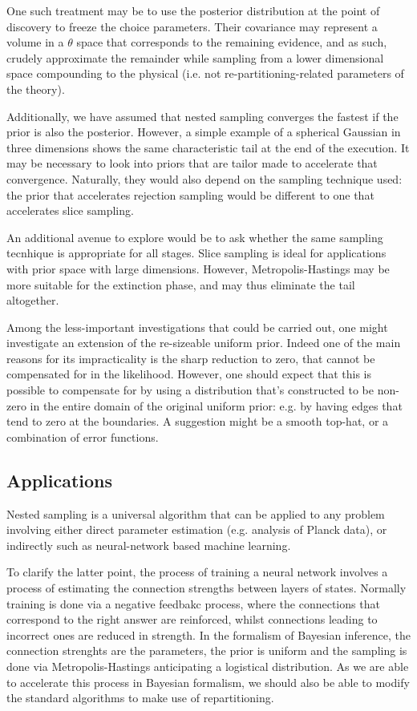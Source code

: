 \documentclass[usenatbib]{mnras}
\begin{document}
One such treatment may be to use the posterior distribution at the
point of discovery to freeze the choice parameters. Their
covariance may represent a volume in a \(\theta\) space that
corresponds to the remaining evidence, and as such, crudely
approximate the remainder while sampling from a lower dimensional
space compounding to the physical (i.e. not re-partitioning-related
parameters of the theory).

Additionally, we have assumed that nested sampling converges the
fastest if the prior is also the posterior. However, a simple
example of a spherical Gaussian in three dimensions shows the same
characteristic tail at the end of the execution. It may be
necessary to look into priors that are tailor made to accelerate
that convergence. Naturally, they would also depend on the sampling
technique used: the prior that accelerates rejection sampling would
be different to one that accelerates slice sampling.

An additional avenue to explore would be to ask whether the same
sampling tecnhique is appropriate for all stages. Slice sampling is
ideal for applications with prior space with large
dimensions. However, Metropolis-Hastings may be more suitable for
the extinction phase, and may thus eliminate the tail altogether.

Among the less-important investigations that could be carried out,
one might investigate an extension of the re-sizeable uniform
prior. Indeed one of the main reasons for its impracticality is the
sharp reduction to zero, that cannot be compensated for in the
likelihood. However, one should expect that this is possible to
compensate for by using a distribution that's constructed to be
non-zero in the entire domain of the original uniform prior:
e.g. by having edges that tend to zero at the boundaries. A
suggestion might be a smooth top-hat, or a combination of error
functions.

\subsection{Applications}
\label{sec:org7e38946}
Nested sampling is a universal algorithm that can be applied to any
problem involving either direct parameter estimation (e.g. analysis
of Planck data), or indirectly such as neural-network based machine
learning.

To clarify the latter point, the process of training a neural
network involves a process of estimating the connection strengths
between layers of states. Normally training is done via a negative
feedbakc process, where the connections that correspond to the
right answer are reinforced, whilst connections leading to
incorrect ones are reduced in strength. In the formalism of
Bayesian inference, the connection strenghts are the parameters,
the prior is uniform and the sampling is done via
Metropolis-Hastings anticipating a logistical distribution. As we
are able to accelerate this process in Bayesian formalism, we
should also be able to modify the standard algorithms to make use
of repartitioning.
\end{document}
